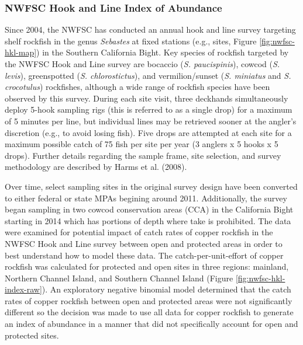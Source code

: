 \documentclass[11pt,
  english,
  letterpaper,
]{article}
\begin{document}
\hypertarget{nwfsc-hkl-model}{%
\subsubsection{NWFSC Hook and Line Index of Abundance}\label{nwfsc-hkl-model}}

Since 2004, the NWFSC has conducted an annual hook and line survey targeting shelf rockfish in the genus \emph{Sebastes} at fixed stations (e.g., sites, Figure \ref{fig:nwfsc-hkl-map}) in the Southern California Bight. Key species of rockfish targeted by the NWFSC Hook and Line survey are bocaccio (\emph{S. paucispinis}), cowcod (\emph{S. levis}), greenspotted (\emph{S. chlorostictus}), and vermilion/sunset (\emph{S. miniatus} and \emph{S. crocotulus}) rockfishes, although a wide range of rockfish species have been observed by this survey. During each site visit, three deckhands simultaneously deploy 5-hook sampling rigs (this is referred to as a single drop) for a maximum of 5 minutes per line, but individual lines may be retrieved sooner at the angler's discretion (e.g., to avoid losing fish). Five drops are attempted at each site for a maximum possible catch of 75 fish per site per year (3 anglers x 5 hooks x 5 drops). Further details regarding the sample frame, site selection, and survey methodology are described by Harms et al. (2008).

Over time, select sampling sites in the original survey design have been converted to either federal or state MPAs begining around 2011. Additionally, the survey began sampling in two cowcod conservation areas (CCA) in the California Bight starting in 2014 which has portions of depth where take is prohibited. The data were examined for potential impact of catch rates of copper rockfish in the NWFSC Hook and Line survey between open and protected areas in order to best understand how to model these data. The catch-per-unit-effort of copper rockfish was calculated for protected and open sites in three regions: mainland, Northern Channel Island, and Southern Channel Island (Figure \ref{fig:nwfsc-hkl-index-raw}). An exploratory negative binomial model determined that the catch rates of copper rockfish between open and protected areas were not significantly different so the decision was made to use all data for copper rockfish to generate an index of abundance in a manner that did not specifically account for open and protected sites.
\end{document}
